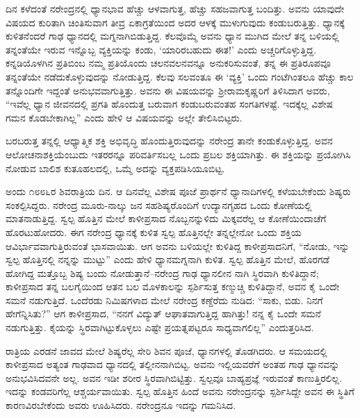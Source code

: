 ದಿನ ಕಳೆದಂತೆ ನರೇಂದ್ರನಲ್ಲಿ ಧ್ಯಾನಭಾವ ಹೆಚ್ಚು ಆಳವಾಗುತ್ತ, ಹೆಚ್ಚು ಸಹಜವಾಗುತ್ತ ಬಂದಿತ್ತು. ಅವನು ಯಾವುದೇ ವಿಷಯದ ಕುರಿತಾಗಿ ಚಿಂತಿಸುವಾಗ ತೀವ್ರ ಏಕಾಗ್ರತೆಯಿಂದ ಅದರ ಆಳಕ್ಕೆ ಮುಳುಗುವುದು ಕಂಡುಬರುತ್ತಿತ್ತು. ಧ್ಯಾನಕ್ಕೆ ಕುಳಿತನೆಂದರೆ ಗಾಢ ಧ್ಯಾನದಲ್ಲಿ ಮಗ್ನನಾಗಿಬಿಡುತ್ತಿದ್ದ. ಕೆಲವೊಮ್ಮೆ ಅವನು ಧ್ಯಾನ ಮುಗಿದ ಮೇಲೆ ತನ್ನ ಬಳಿಯಲ್ಲಿ ತನ್ನಂತೆಯೇ ಇರುವ ಇನ್ನೊಬ್ಬ ವ್ಯಕ್ತಿಯನ್ನು ಕಂಡು, ‘ಯಾರಿರಬಹುದು ಈತ!’ ಎಂದು ಅಚ್ಚರಿಗೊಳ್ಳುತ್ತಿದ್ದ. ಕನ್ನಡಿಯೊಳಗಿನ ಪ್ರತಿಬಿಂಬ ನಮ್ಮ ಪ್ರತಿಯೊಂದು ಚಲನವಲನವನ್ನೂ ಅನುಕರಿಸುವಂತೆ, ತನ್ನ ಈ ಪ್ರತಿರೂಪವೂ ತನ್ನಂತೆಯೇ ನಡೆದುಕೊಳ್ಳುವುದನ್ನು ನೋಡುತ್ತಿದ್ದ. ಕೆಲವು ಸಲವಂತೂ ಈ ‘ವ್ಯಕ್ತಿ’ ಒಂದು ಗಂಟೆಗಿಂತಲೂ ಹೆಚ್ಚು ಕಾಲ ತನ್ನೊಂದಿಗೇ ಇದ್ದಂತೆ ಅನುಭವವಾಗುತ್ತಿತ್ತು. ಅವನು ಈ ವಿಷಯವನ್ನು ಶ್ರೀರಾಮಕೃಷ್ಣರಿಗೆ ತಿಳಿಸಿದಾಗ ಅವರು, “ಇವೆಲ್ಲ ಧ್ಯಾನ ಜೀವನದಲ್ಲಿ ಪ್ರಗತಿ ಹೊಂದುತ್ತ ಬರುವಾಗ ಕಂಡುಬರುವಂತಹ ಸಂಗತಿಗಳಷ್ಟೆ. ಇದಕ್ಕೆಲ್ಲ ವಿಶೇಷ ಗಮನ ಕೊಡಬೇಕಾಗಿಲ್ಲ” ಎಂದು ಹೇಳಿ ಆ ವಿಷಯವನ್ನು ಅಲ್ಲೇ ತೇಲಿಸಿಬಿಟ್ಟರು.

ಬರಬರುತ್ತ ತನ್ನಲ್ಲಿ ಆಧ್ಯಾತ್ಮಿಕ ಶಕ್ತಿ ಅಭಿವೃದ್ಧಿ ಹೊಂದುತ್ತಿರುವುದನ್ನು ನರೇಂದ್ರ ತಾನೇ ಕಂಡುಕೊಳ್ಳುತ್ತಿದ್ದ. ಅವನ ಆಲೋಚನಾಶಕ್ತಿಯೆಂಬುದು ಇತರರನ್ನೂ ಪರಿವರ್ತಿಸಬಲ್ಲ ಒಂದು ಪ್ರಬಲ ಶಕ್ತಿಯಾಗಿತ್ತು. ಈ ಶಕ್ತಿಯನ್ನು ಪ್ರಯೋಗಿಸಿ ನೋಡುವ ಬಾಲಿಶ ಕುತೂಹಲದಲ್ಲಿ, ಒಮ್ಮೆ ಅದನ್ನು ವ್ಯಕ್ತಪಡಿಸಿಯೂಬಿಟ್ಟ.

ಅಂದು ೧೮೮೬ರ ಶಿವರಾತ್ರಿಯ ದಿನ. ಆ ದಿನವೆಲ್ಲ ವಿಶೇಷ ಪೂಜೆ ಪ್ರಾರ್ಥನೆ ಧ್ಯಾನಾದಿಗಳಲ್ಲಿ ಕಳೆಯಬೇಕೆಂದು ಶಿಷ್ಯರು ಸಂಕಲ್ಪಿಸಿದ್ದರು. ನರೇಂದ್ರ ಮೂರು-ನಾಲ್ಕು ಜನ ಸಹಶಿಷ್ಯರೊಂದಿಗೆ ಉದ್ಯಾನಗೃಹದ ಒಂದು ಕೋಣೆಯಲ್ಲಿ ಮಾತನಾಡುತ್ತಿದ್ದ. ಸ್ವಲ್ಪ ಹೊತ್ತಿನ ಮೇಲೆ ಕಾಳೀಪ್ರಸಾದ ನೊಬ್ಬನನ್ನುಳಿದು ಮಿಕ್ಕವರೆಲ್ಲ ಆ ಕೋಣೆಯಿಂದಾಚೆಗೆ ಹೊರಟುಹೋದರು. ಈಗ ನರೇಂದ್ರ ಧ್ಯಾನಕ್ಕೆ ಕುಳಿತ ಸ್ವಲ್ಪ ಹೊತ್ತಿನಲ್ಲೇ ತನ್ನಲ್ಲೇನೋ ಒಂದು ಶಕ್ತಿಯ ಆವಿರ್ಭಾವವಾಗುತ್ತಿರುವಂತೆ ಭಾಸವಾಯಿತು. ಆಗ ಅವನು ಬಳಿಯಲ್ಲೇ ಕುಳಿತಿದ್ದ ಕಾಳೀಪ್ರಸಾದನಿಗೆ, “ನೋಡು, ಇನ್ನು ಸ್ವಲ್ಪ ಹೊತ್ತಿನಲ್ಲಿ ನನ್ನನ್ನು ಮುಟ್ಟು” ಎಂದು ಹೇಳಿ ಧ್ಯಾನಮಗ್ನನಾಗಿ ಕುಳಿತ. ಸ್ವಲ್ಪ ಹೊತ್ತಿನ ಮೇಲೆ, ಹೊರಗಡೆ ಹೋಗಿದ್ದ ಮತ್ತೊಬ್ಬ ಶಿಷ್ಯ ಬಂದು ನೋಡುತ್ತಾನೆ–ನರೇಂದ್ರ ಗಾಢ ಧ್ಯಾನಲೀನ ನಾಗಿ ಸ್ಥಿರವಾಗಿ ಕುಳಿತಿದ್ದಾನೆ; ಕಾಳೀಪ್ರಸಾದ ತನ್ನ ಬಲಗೈಯಿಂದ ಆತನ ಬಲ ಮೊಳಕಾಲನ್ನು ಸ್ಪರ್ಶಿಸುತ್ತ ಕಣ್ಮುಚ್ಚಿ ಕುಳಿತಿದ್ದಾನೆ, ಅವನ ಕೈ ಒಂದೇ ಸಮನೆ ನಡುಗುತ್ತಿದೆ. ಒಂದೆರಡು ನಿಮಿಷಗಳಾದ ಮೇಲೆ ನರೇಂದ್ರ ಕಣ್ದೆರೆದು ನುಡಿದ: “ಸಾಕು, ಬಿಡು. ನಿನಗೆ ಹೇಗೆನ್ನಿಸಿತು?” ಆಗ ಕಾಳೀಪ್ರಸಾದ, “ನನಗೆ ವಿದ್ಯುತ್ ಆಘಾತವಾಗುತ್ತಿದ್ದ ಹಾಗಿತ್ತು! ನನ್ನ ಕೈ ಒಂದೇ ಸಮನೆ ನಡುಗುತ್ತಿತ್ತು. ಕೈಯನ್ನು ಸ್ಥಿರವಾಗಿಟ್ಟುಕೊಳ್ಳಲು ಎಷ್ಟೇ ಪ್ರಯತ್ನಪಟ್ಟರೂ ಸಾಧ್ಯವಾಗಲಿಲ್ಲ” ಎಂದುತ್ತರಿಸಿದ. 

ರಾತ್ರಿಯ ಎರಡನೆ ಜಾವದ ಮೇಲೆ ಶಿಷ್ಯರೆಲ್ಲ ಸೇರಿ ಶಿವನ ಪೂಜೆ, ಧ್ಯಾನಗಳಲ್ಲಿ ತೊಡಗಿದರು. ಆ ಸಮಯದಲ್ಲಿ ಕಾಳೀಪ್ರಸಾದ ಅತ್ಯಂತ ಗಾಢವಾದ ಧ್ಯಾನದಲ್ಲಿ ತಲ್ಲೀನನಾಗಿಬಿಟ್ಟ. ಅವನು ಇಲ್ಲಿಯವರೆಗೆ ಅಂತಹ ಗಾಢ ಧ್ಯಾನವನ್ನು ಅನುಭವಿಸಿದವನೇ ಅಲ್ಲ. ಅವನ ಇಡೀ ಶರೀರ ಸ್ಥಿರವಾಗಿಬಿಟ್ಟಿತ್ತು. ಸ್ವಲ್ಪವೂ ಬಾಹ್ಯಪ್ರಜ್ಞೆ ಇರುವಂತೆ ಕಾಣುತ್ತಿರಲಿಲ್ಲ. ಇದನ್ನು ಕಂಡವರಿಗೆಲ್ಲ ಆಶ್ಚರ್ಯವಾಯಿತು. ಸ್ವಲ್ಪ ಹೊತ್ತಿನ ಹಿಂದೆ ಅವನು ನರೇಂದ್ರನನ್ನು ಸ್ಪರ್ಶಿಸಿದ್ದೇ ಅವನ ಈ ಸ್ಥಿತಿಗೆ ಕಾರಣವಿರಬೇಕೆಂದು ಅವರು ಊಹಿಸಿದರು. ನರೇಂದ್ರನೂ ಇದನ್ನು ಗಮನಿಸಿದ.

